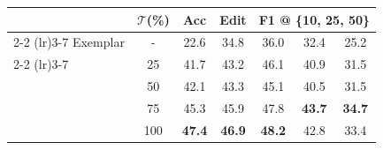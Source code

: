 \begin{table}[tb]
\centering
\begin{tabular}{lcccccc}
\toprule
&$\mathcal{T}$(\%)  & Acc & Edit & \multicolumn{3}{c}{F1 @ \{10, 25, 50\}} \\ \cmidrule(lr){2-2} \cmidrule(lr){3-7}
Exemplar& - & 22.6 & 34.8 & 36.0 & 32.4 & 25.2\\ \cmidrule(lr){2-2} \cmidrule(lr){3-7}
\multirow{4}{*}{Ours}&25 & {41.7} & {43.2} & {46.1} & {40.9} & 31.5 \\ 
&50 & {42.1} & {43.3} & {45.1} & {40.5} & 31.5 \\ 
&75 & {45.3} & {45.9} & {47.8} & \textbf{43.7} & \textbf{34.7} \\ 
\rowcolor{gray!30}\cellcolor{white} & 100 & \textbf{47.4} & \textbf{46.9} & \textbf{48.2} & {42.8} & 33.4 \\ \bottomrule
\end{tabular}
\label{tab:vaeratio}
\end{table}